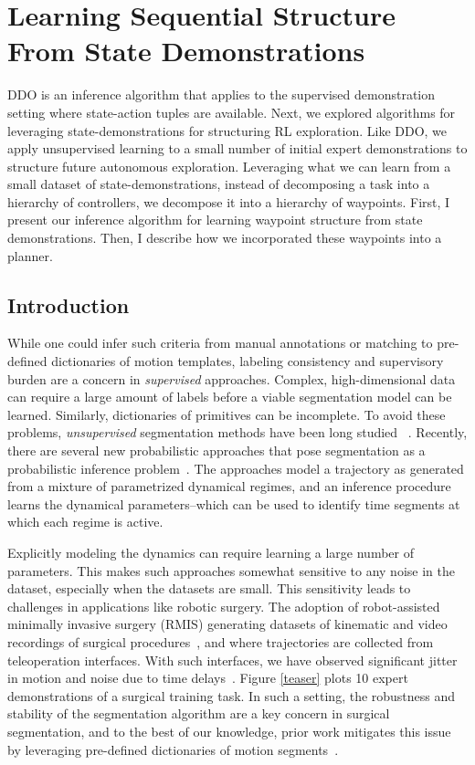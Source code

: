 \section{Learning Sequential Structure From State Demonstrations}
DDO is an inference algorithm that applies to the supervised demonstration setting where state-action tuples are available. Next, we explored algorithms for leveraging state-demonstrations for structuring RL exploration.
Like DDO, we apply unsupervised learning to a small number of initial expert demonstrations to structure future autonomous exploration. Leveraging what we can learn from a small dataset of state-demonstrations, instead of decomposing a task into a hierarchy of controllers, we decompose it into a hierarchy of waypoints. First, I present our inference algorithm for learning waypoint structure from state demonstrations. Then, I describe how we incorporated these waypoints into a planner.

\subsection*{Introduction}
While one could infer such criteria from manual annotations or matching to pre-defined dictionaries of motion templates, labeling consistency and supervisory burden are a concern in \emph{supervised} approaches.
Complex, high-dimensional data can require a large amount of labels before a viable segmentation model can be learned.
Similarly, dictionaries of primitives can be incomplete.
To avoid these problems, \emph{unsupervised} segmentation methods have been long studied ~\cite{viviani1985segmentation,morasso1983three,sternad1999segmentation}.
Recently, there are several new probabilistic approaches that pose segmentation as a probabilistic inference problem~\cite{barbivc2004segmenting, chiappa2010movement,  alvarez2010switched,kruger2012imitation, niekum2012learning, wachter2015hierarchical}.
The approaches model a trajectory as generated from a mixture of parametrized dynamical regimes, and an inference procedure learns the dynamical parameters--which can be used to identify time segments at which each regime is active.

Explicitly modeling the dynamics can require learning a large number of parameters.
This makes such approaches somewhat sensitive to any noise in the dataset, especially when the datasets are small. 
This sensitivity leads to challenges in applications like robotic surgery.
The adoption of robot-assisted minimally invasive surgery (RMIS)  generating datasets of kinematic and video recordings of surgical procedures~\cite{gao2014jigsaws}, and where trajectories are collected from teleoperation interfaces.
With such interfaces, we have observed significant jitter in motion and noise due to time delays~\cite{chuck2017statistical, liangusing}.
Figure \ref{teaser} plots 10 expert demonstrations of a surgical training task.
In such a setting, the robustness and stability of the segmentation algorithm are a key concern in surgical segmentation, and to the best of our knowledge, prior work mitigates this issue by leveraging pre-defined dictionaries of motion segments~\cite{lin2006towards, lin2005automatic}.


